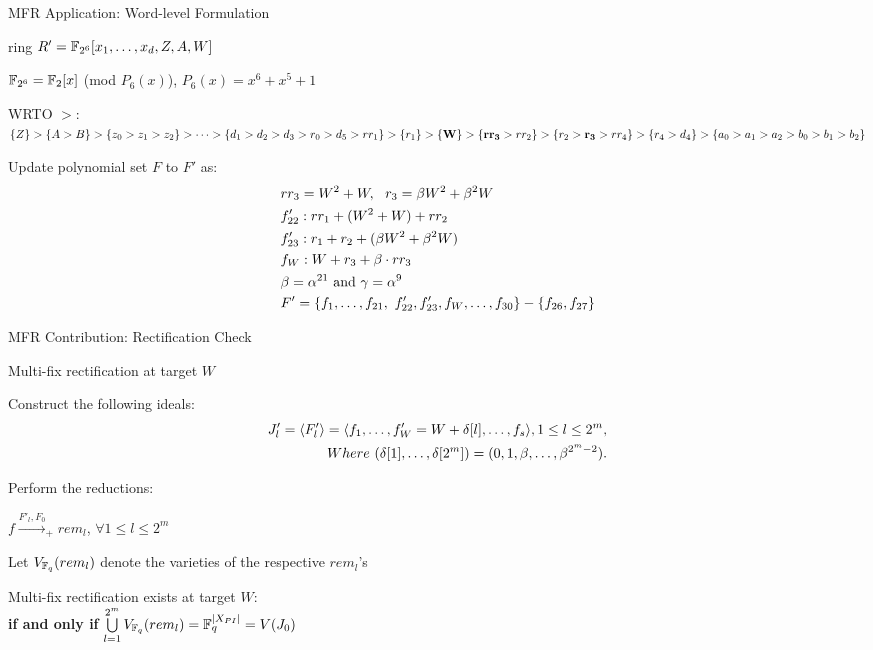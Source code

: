 \begin{frame}{\large MFR Application: Word-level Formulation }
\bi
	\item ring $R' = {\mathbb{F}}_{2^6}[x_1,\dots,x_d,Z,A,W]$ 
	\bi
		\item ${\mathbb{F}}_{2^6} = {\mathbb{F}}_2[x]$ (mod $P_6(x)$), $P_6(x) = x^6+x^5+1$
		\pause 
		\vspace{0.1in}
		\item WRTO $>$: {\small 
$\{Z\}>\{A>B\}>\{z_0>z_1>z_2\}>\cdots>\{d_1>d_2>d_3>r_0>d_5>rr_1\}>
\{r_1\}>{\bf \{W\}}>\{{\bf rr_3}>rr_2\}>\{r_2>{\bf r_3}>rr_4\}>\{r_4>d_4\}>\{a_0>a_1>a_2>b_0>b_1>b_2\}$}

	\ei
	\vspace{0.1in}
	\pause
	\item Update polynomial set $F$ to $F'$ as:
	\begin{align*}
		&rr_3= W^2+W,~~r_3 = \beta W^2 +\beta^2W \\
		&f'_{22}:rr_1  + (W^2+W) + rr_2\\
		&f'_{23}:r_1 + r_2 + (\beta W^2 +\beta^2 W)\\
		&f_W:W + r_3 + \beta \cdot rr_3\\     
		&\beta=\alpha^{21} \text{ and } \gamma=\alpha^9 \\
		&F'=\{f_1,\dots,f_{21},~f'_{22},f'_{23},f_W,\dots,f_{30}\}-\{f_{26},f_{27}\}
	\end{align*}
\ei
\end{frame}

\begin{frame}{\large MFR Contribution: Rectification Check}
\bi
	\item Multi-fix rectification at target $W$
	\vspace{0.1in}
	\bi
		\item Construct the following ideals:
		\begin{align*}
			J_l' = \langle F_l'\rangle =\langle f_1,\dots,f_W'=W+\delta[l],\dots,f_s\rangle,1 \leq l \leq 2^m, \\
  			Where~(\delta[1],\dots,\delta[2^{m}]) =(0,1,\beta,\dots,\beta^{2^m-2}).
		\end{align*}
		\pause
		\item Perform the reductions: 
		\bi
			\item $f\xrightarrow{F'_l, F_0}_+rem_l $, $\forall 1 \leq l \leq 2^m$
		\ei
		\item Let $V_{{\mathbb{F}}_{q}}(rem_l)$ denote the varieties of the respective $rem_l$'s
		\vspace{0.1in}
		\pause
		\item Multi-fix rectification exists at target $W$: \\  
				\centering
				{\bf if and only if} $\bigcup\limits_{l=1}^{2^m}V_{{\mathbb{F}}_{q}}(rem_l) = {\mathbb{F}}_{q}^{|X_{PI}|} = V(J_0)$
	\ei
\ei
\end{frame}

